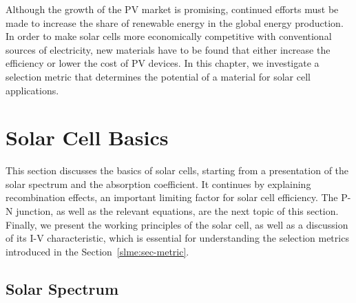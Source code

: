 \begin{refsection}
Although the growth of the \gls{PV} market is promising, continued efforts must be 
made to increase the share of renewable energy in the global energy 
production. In order to make solar cells more economically competitive with 
conventional sources of electricity, new materials have to be found that 
either increase the efficiency or lower the cost of \gls{PV} devices. In this 
chapter, we investigate a selection metric that determines the potential of a 
material for solar cell applications. 
 
\section{Solar Cell Basics} \label{slme:sec-basics} 
 
This section discusses the basics of solar cells, starting from a presentation 
of the solar spectrum and the absorption coefficient. It continues by 
explaining recombination effects, an important limiting factor for solar cell 
efficiency. The P-N junction, as well as the relevant equations, are the next 
topic of this section. Finally, we present the working principles of the solar 
cell, as well as a discussion of its I-V characteristic, which is essential 
for understanding the selection metrics introduced in the 
Section~\ref{slme:sec-metric}. 
 
\subsection{Solar Spectrum} 
 

\end{refsection}
